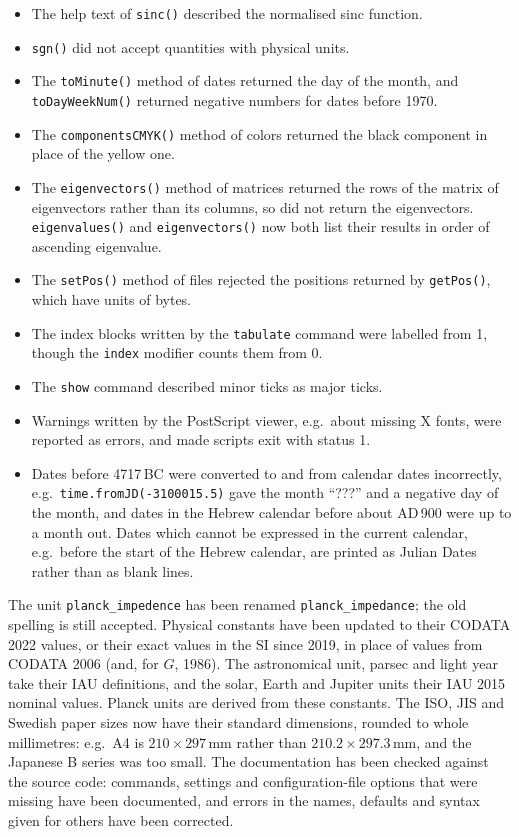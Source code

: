 \begin{itemize}
\item The help text of {\tt sinc()} described the normalised sinc function.
\item {\tt sgn()} did not accept quantities with physical units.
\item The {\tt toMinute()} method of dates returned the day of the month, and {\tt toDayWeekNum()} returned negative numbers for dates before 1970.
\item The {\tt componentsCMYK()} method of colors returned the black component in place of the yellow one.
\item The {\tt eigenvectors()} method of matrices returned the rows of the matrix of eigenvectors rather than its columns, so did not return the eigenvectors. {\tt eigenvalues()} and {\tt eigenvectors()} now both list their results in order of ascending eigenvalue.
\item The {\tt setPos()} method of files rejected the positions returned by {\tt getPos()}, which have units of bytes.
\item The index blocks written by the {\tt tabulate} command were labelled from 1, though the {\tt index} modifier counts them from 0.
\item The {\tt show} command described minor ticks as major ticks.
\item Warnings written by the PostScript viewer, e.g.\ about missing X fonts, were reported as errors, and made scripts exit with status 1.
\item Dates before 4717\,BC were converted to and from calendar dates incorrectly, e.g.\ {\tt time.fromJD(-3100015.5)} gave the month ``???'' and a negative day of the month, and dates in the Hebrew calendar before about AD\,900 were up to a month out. Dates which cannot be expressed in the current calendar, e.g.\ before the start of the Hebrew calendar, are printed as Julian Dates rather than as blank lines.
\end{itemize}

\noindent The unit {\tt planck\_impedence} has been renamed {\tt planck\_impedance}; the old spelling is still accepted. Physical constants have been updated to their CODATA 2022 values, or their exact values in the SI since 2019, in place of values from CODATA 2006 (and, for $G$, 1986). The astronomical unit, parsec and light year take their IAU definitions, and the solar, Earth and Jupiter units their IAU 2015 nominal values. Planck units are derived from these constants. The ISO, JIS and Swedish paper sizes now have their standard dimensions, rounded to whole millimetres: e.g.\ A4 is $210\times297$\,mm rather than $210.2\times297.3$\,mm, and the Japanese B series was too small. The documentation has been checked against the source code: commands, settings and configuration-file options that were missing have been documented, and errors in the names, defaults and syntax given for others have been corrected.

